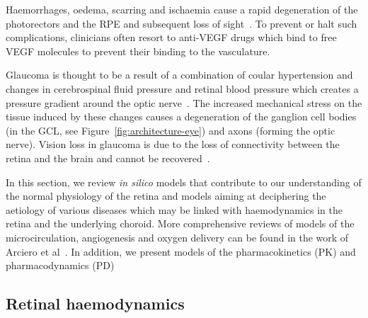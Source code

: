 \documentclass{article}
\begin{document}
Haemorrhages, oedema, scarring and ischaemia cause a rapid degeneration of the photorectors and the RPE and subsequent loss of sight~\cite{Gupta_2015,Jager_2008}.
To prevent or halt such complications, clinicians often resort to anti-VEGF drugs which bind to free VEGF molecules to prevent their binding to the vasculature.

Glaucoma is thought to be a result of a combination of coular hypertension and changes in cerebrospinal fluid pressure and retinal blood pressure which creates a pressure gradient around the optic nerve~\cite{Band_2009,Nickells_2012}.
The increased mechanical stress on the tissue induced by these changes causes a degeneration of the ganglion cell bodies (in the GCL, see Figure~\ref{fig:architecture-eye}) and axons (forming the optic nerve).
Vision loss in glaucoma is due to the loss of connectivity between the retina and the brain and cannot be recovered~\cite{Quigley_2011}.


In this section, we review \textit{in silico} models that contribute to our understanding of the normal physiology of the retina and models aiming at deciphering the aetiology of various diseases which may be linked with haemodynamics in the retina and the underlying choroid.
More comprehensive reviews of models of the microcirculation, angiogenesis and oxygen delivery can be found in the work of Arciero et al~\cite{Arciero_2017, Arciero_2019}.
In addition, we present models of the pharmacokinetics (PK) and pharmacodynamics (PD)


\subsection{Retinal haemodynamics} \label{subsec:RetinalHaemodynamics}
\end{document}
